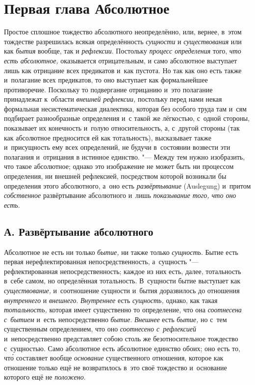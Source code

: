 \chapter[{\em Первая глава} Абсолютное]{Первая глава Абсолютное}

Простое сплошное тождество абсолютного неопределённо, или, вернее, в~этом
тождестве разрешилась всякая определённость {\em сущности} и
{\em существования} или как {\em бытия} вообще, так и {\em рефлексии}.
Постольку {\em процесс определения} того, {\em что есть абсолютное,}
оказывается отрицательным, и
само абсолютное выступает лишь как отрицание всех предикатов и~как пустота.
Но так как оно есть также и~полагание всех предикатов, то оно выступает как
формальнейшее противоречие. Поскольку то подвергание отрицанию и~это
полагание принадлежат к~области {\em внешней
рефлексии,} постольку перед нами некая формальная несистематическая
диалектика, которая без особого труда там и~сям подбирает разнообразные
определения и~с такой же лёгкостью, с~одной стороны, показывает их
конечность и~голую относительность, а, с~другой стороны (так как абсолютное
предносится ей как тотальность), высказывает также и~присущность ему всех
определений, не будучи в~состоянии возвести эти полагания и~отрицания в
истинное единство. "--- Между тем нужно изобразить, что такое абсолютное;
однако это изображение не может быть ни процессом определения, ни внешней
рефлексией, посредством которой возникали бы определения этого абсолютного,
а~оно есть {\em развёртывание} (Auslegung) и~притом
{\em собственное} развёртывание абсолютного и~лишь
{\em показывание того, что оно есть}.

\section[А. Развёртывание абсолютного]{А. Развёртывание абсолютного}

Абсолютное не есть ни только
{\em бытие,} ни также только
{\em сущность}. Бытие есть первая нерефлектированная
непосредственность, а~сущность "--- рефлектированная непосредственность;
каждое из них есть, далее, тотальность в~себе самом, но определённая
тотальность. В~сущности бытие выступает как
{\em существование,} и~соотношение сущности и~бытия
доразвилось до отношения {\em внутреннего} и
{\em внешнего}. {\em Внутреннее}
есть {\em сущность,} однако, как такая
{\em тотальность,} которая имеет существенно то
определение, что она {\em соотнесена с~бытием} и~есть
непосредственно {\em бытие}.
{\em Внешнее} есть {\em бытие,} но
с~тем существенным определением, что оно
{\em соотнесено с~рефлексией} и~непосредственно
представляет собою столь же безотносительное тождество с~сущностью. Само
абсолютное есть абсолютное единство обоих; оно есть то, чт\'{о} составляет
вообще {\em основание} существенного отношения, которое
как отношение только ещё не возвратилось в~это своё тождество и~основание
которого ещё не {\em положено}.

